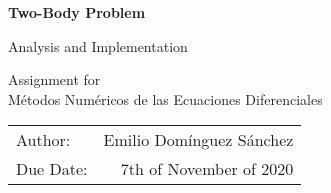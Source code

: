 \begin{titlepage}
    \begin{center}
        \vspace*{1cm}
        
        \Huge \textbf{Two-Body Problem}
        
        \vspace{0.5cm}
        \LARGE Analysis and Implementation
        
        \vspace{0.5cm}
        
        \Large Assignment for \\ Métodos Numéricos de las Ecuaciones Diferenciales
        
        \vspace{0.5cm}
   		
        \vfill
        
        \vspace{0.8cm}
        \Large
            \begin{flushright}
              	\begin{tabular}{lr}
                  Author: & Emilio Domínguez Sánchez\\
                  Due Date: & 7th of November of 2020\\
                \end{tabular}
            \end{flushright}
        \vspace{0.5cm}
        
    \end{center}
\end{titlepage}
